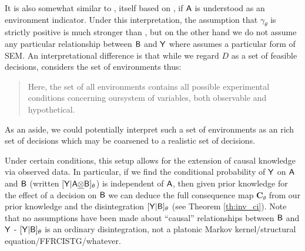 It is also somewhat similar to \citet{arjovsky_invariant_2019}, itself based on \citet{peters_causal_2016}, if $\mathsf{A}$ is understood as an environment indicator. Under this interpretation, the assumption that $\gamma_\theta$ is strictly positive is much stronger than \citet{arjovsky_invariant_2019}, but on the other hand we do not assume any particular relationship between $\mathsf{B}$ and $\mathsf{Y}$ where \citet{arjovsky_invariant_2019} assumes a particular form of SEM. An interpretational difference is that while we regard $D$ as a set of feasible decisions, \citet{arjovsky_invariant_2019} considers the set of environments thus:
\begin{quote}
Here, the set of all environments contains all possible experimental conditions concerning oursystem of variables, both observable and hypothetical.
\end{quote}
As an aside, we could potentially interpret such a set of environments as an rich set of decisions which may be coarsened to a realistic set of decisions.

Under certain conditions, this setup allows for the extension of causal knowledge via observed data. In particular, if we find the conditional probability of $\mathsf{Y}$ on $\mathsf{A}$ and $\mathsf{B}$ (written $[\mathsf{Y}|\mathsf{A}\underline{\otimes}\mathsf{B}]_\theta$) is independent of $\mathsf{A}$, then given prior knowledge for the effect of a decision on $\mathsf{B}$ we can deduce the full consequence map $\mathbf{C}_\theta$ from our prior knowledge and the disintegration $[\mathsf{Y}|\mathsf{B}]_\theta$ (see Theorem \ref{th:inv_ci}). Note that no assumptions have been made about ``causal'' relationships between $\mathsf{B}$ and $\mathsf{Y}$ - $[\mathsf{Y}|\mathsf{B}]_\theta$ is an ordinary disintegration, not a platonic Markov kernel/structural equation/FFRCISTG/whatever.

